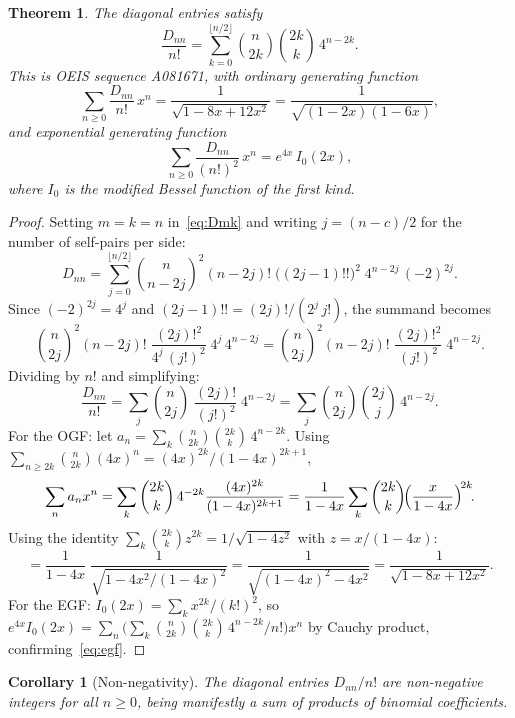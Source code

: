 \documentclass[11pt,a4paper]{article}
\theoremstyle{definition}
\theoremstyle{plain}
\newtheorem{theorem}[definition]{Theorem}
\newtheorem{corollary}[definition]{Corollary}
\begin{document}
\begin{theorem}\label{thm:diagonal}
The diagonal entries satisfy
\begin{equation}\label{eq:diag}
  \frac{D_{nn}}{n!} = \sum_{k=0}^{\lfloor n/2 \rfloor}
  \binom{n}{2k}\binom{2k}{k}\, 4^{n-2k}.
\end{equation}
This is OEIS sequence \textnormal{A081671}, with ordinary generating
function
\begin{equation}\label{eq:ogf}
  \sum_{n \ge 0} \frac{D_{nn}}{n!}\, x^n
  = \frac{1}{\sqrt{1 - 8x + 12x^2}}
  = \frac{1}{\sqrt{(1 - 2x)(1 - 6x)}},
\end{equation}
and exponential generating function
\begin{equation}\label{eq:egf}
  \sum_{n \ge 0} \frac{D_{nn}}{(n!)^2}\, x^n
  = e^{4x}\, I_0(2x),
\end{equation}
where $I_0$ is the modified Bessel function of the first kind.
\end{theorem}

\begin{proof}
Setting $m = k = n$ in~\eqref{eq:Dmk} and writing $j = (n-c)/2$ for
the number of self-pairs per side:
\[
  D_{nn} = \sum_{j=0}^{\lfloor n/2 \rfloor}
  \binom{n}{n-2j}^2 (n-2j)!\; \bigl((2j-1)!!\bigr)^2\;
  4^{n-2j}\, (-2)^{2j}.
\]
Since $(-2)^{2j} = 4^j$ and $(2j-1)!! = (2j)!/(2^j\, j!)$, the
summand becomes
\[
  \binom{n}{2j}^2 (n-2j)!\; \frac{(2j)!^2}{4^j\, (j!)^2}\; 4^j\, 4^{n-2j}
  = \binom{n}{2j}^2 (n-2j)!\; \frac{(2j)!^2}{(j!)^2}\; 4^{n-2j}.
\]
Dividing by $n!$ and simplifying:
\[
  \frac{D_{nn}}{n!}
  = \sum_{j} \binom{n}{2j}\; \frac{(2j)!}{(j!)^2}\; 4^{n-2j}
  = \sum_{j} \binom{n}{2j}\binom{2j}{j}\, 4^{n-2j}.
\]
For the OGF: let $a_n = \sum_k \binom{n}{2k}\binom{2k}{k}\,4^{n-2k}$.
Using $\sum_{n \ge 2k} \binom{n}{2k} (4x)^n
= (4x)^{2k}/(1-4x)^{2k+1}$,
\[
  \sum_{n} a_n x^n
  = \sum_k \binom{2k}{k}\, 4^{-2k}
    \frac{(4x)^{2k}}{(1-4x)^{2k+1}}
  = \frac{1}{1-4x} \sum_k \binom{2k}{k}
    \!\Bigl(\frac{x}{1-4x}\Bigr)^{\!2k}\!.
\]
Using the identity $\sum_k \binom{2k}{k} z^{2k} = 1/\sqrt{1-4z^2}$
with $z = x/(1-4x)$:
\[
  = \frac{1}{1-4x}\; \frac{1}{\sqrt{1 - 4x^2/(1-4x)^2}}
  = \frac{1}{\sqrt{(1-4x)^2 - 4x^2}}
  = \frac{1}{\sqrt{1 - 8x + 12x^2}}.
\]
For the EGF: $I_0(2x) = \sum_k x^{2k}/(k!)^2$, so
$e^{4x} I_0(2x) = \sum_n \bigl(\sum_k
\binom{n}{2k}\binom{2k}{k}\,4^{n-2k}/n!\bigr) x^n$
by Cauchy product, confirming~\eqref{eq:egf}.
\end{proof}

\begin{corollary}[Non-negativity]
The diagonal entries $D_{nn}/n!$ are non-negative integers for all
$n \ge 0$, being manifestly a sum of products of binomial coefficients.
\end{corollary}
\end{document}
